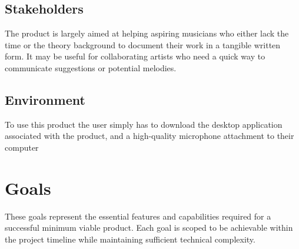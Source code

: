 \documentclass{article}
\begin{document}
\subsection{Stakeholders}

The product is largely aimed at helping aspiring musicians who either lack the time or the theory background to document their work in a tangible written form. It may be useful for collaborating artists who need a quick way to communicate suggestions or potential melodies.

\subsection{Environment}
To use this product the user simply has to download the desktop application associated with the product, and a high-quality microphone attachment to their computer

\section{Goals}
These goals represent the essential features and capabilities required for a successful 
minimum viable product. Each goal is scoped to be achievable within the project timeline 
while maintaining sufficient technical complexity.
\end{document}
